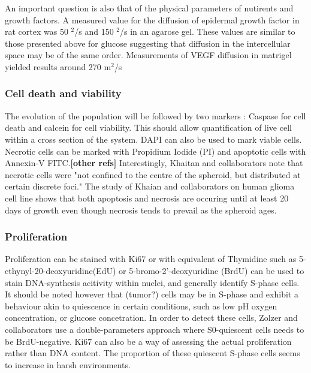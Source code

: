 \documentclass[11pt,a4paper]{article}
\begin{document}
An important question is also that of the physical parameters of nutirents and growth factors. A measured value for the diffusion of epidermal growth factor in rat cortex was 50 \textmu $^2$/s and 150  \textmu $^2$/s in an agarose gel. These values are similar to those presented above for glucose suggesting that diffusion in the intercellular space may be of the same order. Measurements of VEGF diffusion in matrigel yielded results around 270 \textmu m$^2$/s 

\subsubsection{Cell death and viability}
The evolution of the population will be followed by two markers : Caspase for cell death and calcein for cell viability. This should allow quantification of live cell within a cross section of the system. DAPI can also be used to mark viable cells.
Necrotic cells can be marked with Propidium Iodide (PI)  and apoptotic cells with Annexin-V FITC.\cite{Khaitan2006}\textbf{[other refs]} Interestingly, Khaitan and collaborators note that necrotic cells were "not confined to the centre of the spheroid, but distributed at certain discrete foci."\cite{Khaitan2006} The study of Khaian and collaborators on human glioma cell line shows that both apoptosis and necrosis are occuring until at least 20 days of growth even though necrosis tends to prevail as the spheroid ages. 

\subsubsection{Proliferation}
Proliferation can be stained with Ki67 \cite{Grimes2014}\cite{Ghaffarizadeh2017} or with equivalent of Thymidine such as 5-ethynyl-20-deoxyuridine(EdU) or  5-bromo-2'-deoxyuridine (BrdU) can be used to stain DNA-synthesis acitivity within nuclei, and generally identify S-phase cells. It should be noted however that (tumor?) cells may be in S-phase and exhibit a behaviour akin to quiescence in certain conditions, such as low pH oxygen concentration, or glucose concetration. \cite{Zolzer1999}\cite{Khaitan2006} In order to detect these cells, Zolzer and collaborators use a double-parameters approach where S0-quiescent cells needs to be BrdU-negative. Ki67 can also be a way of assessing the actual proliferation rather than DNA content. The proportion of these quiescent S-phase cells seems to increase in harsh environments.
 
\end{document}
